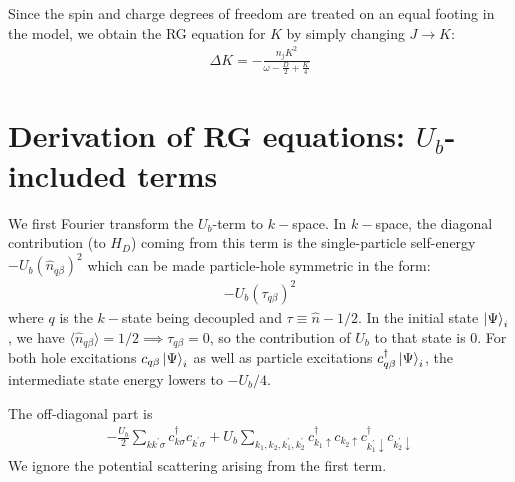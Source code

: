 \documentclass{report}
\numberwithin{equation}{section}
\begin{document}
\begin{appendices}
Since the spin and charge degrees of freedom are treated on an equal footing in the model, we obtain the RG equation for \(K\) by simply changing \(J \to K\):
\begin{equation}\begin{aligned}
	\Delta K = -\frac{n_j K^2}{\omega - \frac{D}{2} + \frac{K}{4}}
\end{aligned}\end{equation}

\chapter{Derivation of RG equations: \(U_b\)-included terms}

We first Fourier transform the \(U_b\)-term to \(k-\)space. In \(k-\)space, the diagonal contribution (to \(H_D\)) coming from this term is the single-particle self-energy \(-U_b\left(\hat n_{q \beta}\right)^2\) which can be made particle-hole symmetric in the form:
\begin{equation}\begin{aligned}
	-U_b\left(\tau_{q \beta}\right)^2
\end{aligned}\end{equation}
where \(q\) is the \(k-\)state being decoupled and \(\tau \equiv \hat n - 1/2\). In the initial state \(\ket{\Psi}_i\), we have \(\langle \hat n_{q\beta} \rangle = 1/2 \implies \tau_{q\beta} = 0\), so the contribution of \(U_b\) to that state is 0. For both hole excitations \(c_{q\beta}\ket{\Psi}_i\) as well as particle excitations \(c^\dagger_{q\beta}\ket{\Psi}_i\), the intermediate state energy lowers to \(-U_b/4\).

The off-diagonal part is
\begin{equation}\begin{aligned}
	-\frac{U_b}{2}\sum_{kk^\prime\sigma}c^\dagger_{k\sigma}c_{k^\prime\sigma} + U_b \sum_{k_1,k_2,k_1^\prime,k_2^\prime} c^\dagger_{k_1 \uparrow}c_{k_2 \uparrow} c^\dagger_{k^\prime_1 \downarrow}c_{k^\prime_2 \downarrow} 
\end{aligned}\end{equation}
We ignore the potential scattering arising from the first term.


\end{appendices}
\end{document}
